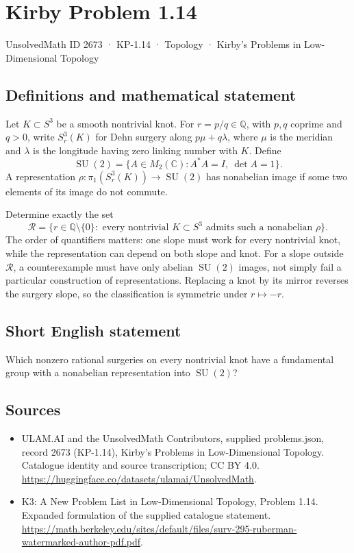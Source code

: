 \documentclass[11pt,a4paper]{article}
\begin{document}
\section*{Kirby Problem 1.14}\label{2673}
{\small UnsolvedMath ID 2673 · KP-1.14 · Topology · Kirby's Problems in Low-Dimensional Topology}
\subsection{Definitions and mathematical statement}
Let $K\subset S^3$ be a smooth nontrivial knot. For $r=p/q\in\mathbb Q$, with
$p,q$ coprime and $q>0$, write $S^3_r(K)$ for Dehn surgery along
$p\mu+q\lambda$, where $\mu$ is the meridian and $\lambda$ is the longitude
having zero linking number with $K$. Define
\[
\operatorname{SU}(2)=\{A\in M_2(\mathbb C):A^*A=I,\ \det A=1\}.
\]
A representation $\rho:\pi_1(S^3_r(K))\to\operatorname{SU}(2)$ has nonabelian
image if some two elements of its image do not commute.

Determine exactly the set
\[
\mathcal R=\{r\in\mathbb Q\setminus\{0\}:\text{ every nontrivial }K\subset S^3
\text{ admits such a nonabelian }\rho\}.
\]
The order of quantifiers matters: one slope must work for every nontrivial knot,
while the representation can depend on both slope and knot. For a slope outside
$\mathcal R$, a counterexample must have only abelian $\operatorname{SU}(2)$ images,
not simply fail a particular construction of representations. Replacing a knot
by its mirror reverses the surgery slope, so the classification is symmetric
under $r\mapsto-r$.
\subsection{Short English statement}
Which nonzero rational surgeries on every nontrivial knot have a fundamental group with a nonabelian representation into $\operatorname{SU}(2)$?
\subsection{Sources}
\begin{itemize}
\item[S1] ULAM.AI and the UnsolvedMath Contributors, supplied problems.json, record 2673 (KP-1.14), Kirby's Problems in Low-Dimensional Topology. Catalogue identity and source transcription; CC BY 4.0.
\url{https://huggingface.co/datasets/ulamai/UnsolvedMath}.
\item[S2] K3: A New Problem List in Low-Dimensional Topology, Problem 1.14. Expanded formulation of the supplied catalogue statement.
\url{https://math.berkeley.edu/sites/default/files/surv-295-ruberman-watermarked-author-pdf.pdf}.
\end{itemize}
\end{document}
